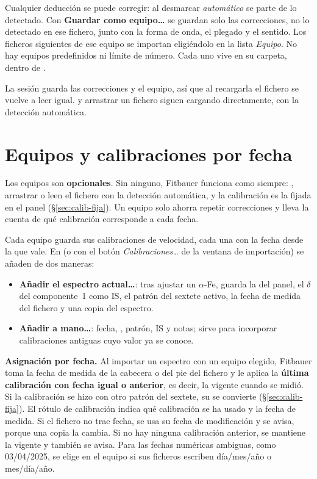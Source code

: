 Cualquier deducción se puede corregir: al desmarcar \emph{automático} se parte de
lo detectado. Con \textbf{Guardar como equipo…} se guardan solo las correcciones,
no lo detectado en ese fichero, junto con la forma de onda, el plegado y el
sentido. Los ficheros siguientes de ese equipo se importan eligiéndolo en la lista
\emph{Equipo}. No hay equipos predefinidos ni límite de número. Cada uno vive en su
carpeta, dentro de .

La sesión guarda las correcciones y el equipo, así que al recargarla el fichero se
vuelve a leer igual.  y arrastrar un fichero siguen
cargando directamente, con la detección automática.

\section{Equipos y calibraciones por fecha}
\label{sec:equipos-calibraciones}

Los equipos son \textbf{opcionales}. Sin ninguno, Fitbauer funciona como siempre:
, arrastrar o  leen el fichero con la
detección automática, y la calibración es la fijada en el panel (§\ref{sec:calib-fija}).
Un equipo solo ahorra repetir correcciones y lleva la cuenta de qué calibración
corresponde a cada fecha.

Cada equipo guarda sus calibraciones de velocidad, cada una con la fecha desde la
que vale. En  (o con el botón
\emph{Calibraciones…} de la ventana de importación) se añaden de dos maneras:

\begin{itemize}[nosep]
  \item \textbf{Añadir el espectro actual…}: tras ajustar un $\alpha$-Fe, guarda la
     del panel, el $\delta$ del componente~1 como IS, el patrón del sextete
    activo, la fecha de medida del fichero y una copia del espectro.
  \item \textbf{Añadir a mano…}: fecha, , patrón, IS y notas; sirve
    para incorporar calibraciones antiguas cuyo valor ya se conoce.
\end{itemize}

\textbf{Asignación por fecha.} Al importar un espectro con un equipo elegido,
Fitbauer toma la fecha de medida de la cabecera o del pie del fichero y le aplica
la \textbf{última calibración con fecha igual o anterior}, es decir, la vigente
cuando se midió. Si la calibración se hizo con otro patrón del sextete, su
 se convierte (§\ref{sec:calib-fija}). El rótulo de calibración
indica qué calibración se ha usado y la fecha de medida. Si el fichero no trae
fecha, se usa su fecha de modificación y se avisa, porque una copia la cambia.
Si no hay ninguna calibración anterior, se mantiene la vigente y también se
avisa. Para las fechas numéricas ambiguas, como 03/04/2025, se elige en el equipo
si sus ficheros escriben día/mes/año o mes/día/año.

